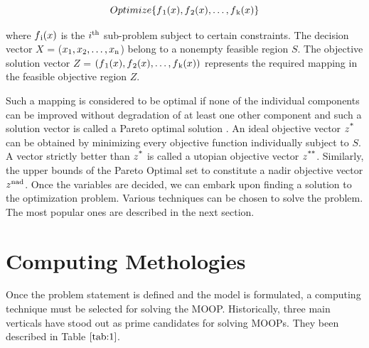 \documentclass[conference]{IEEEtran}
\begin{document}
\begin{equation}
Optimize \{f\textsubscript{1}(x), f\textsubscript{2}(x), \dots, f\textsubscript{k}(x)\}
\end{equation}

where $f\textsubscript{i}(x)$ is the $i\textsuperscript{th}$ sub-problem subject to certain constraints. The decision vector $X$ = ($x\textsubscript{1}, x\textsubscript{2}, \dots, x\textsubscript{n}$) belong to a nonempty feasible region $S$. The objective solution vector $Z$ =  $(f\textsubscript{1}(x), f\textsubscript{2}(x), \dots, f\textsubscript{k}(x))$ represents the required mapping in the feasible objective region $Z$. 

Such a mapping is considered to be optimal if none of the individual components can be improved without degradation of at least one other component and such a solution vector is called a Pareto optimal solution \cite{pare}. An ideal objective vector $z\textsuperscript{*}$ can be obtained by minimizing every objective function individually subject to $S$. A vector strictly better than $z\textsuperscript{*}$ is called a utopian objective vector $z\textsuperscript{**}$. Similarly, the upper bounds of the Pareto Optimal set to constitute a nadir objective vector $z\textsuperscript{nad}$. Once the variables are decided, we can embark upon finding a solution to the optimization problem. Various techniques can be chosen to solve the problem. The most popular ones are described in the next section. 

\section{Computing Methologies}

Once the problem statement is defined and the model is formulated, a computing technique must be selected for solving the MOOP. Historically, three main verticals have stood out as prime candidates for solving MOOPs. They been described in Table $\ref{tab:1}$. 
\end{document}
